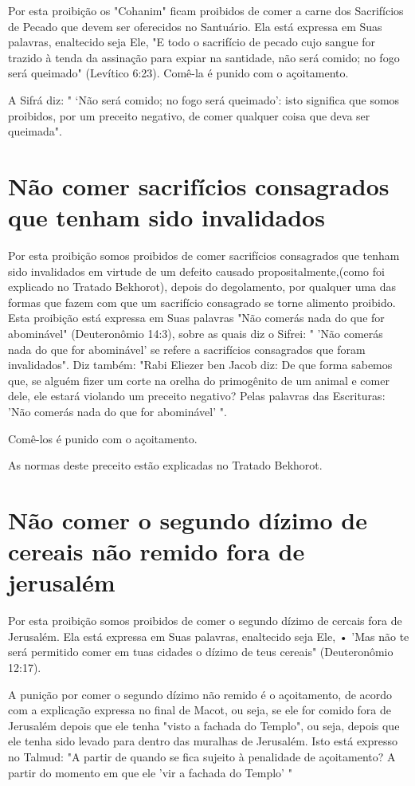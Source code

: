 \begin{itemize}
\begin{enumrate}
\begin{itemize}
\begin{itemize}
\begin{itemize}
Por esta proibição os "Cohanim" ficam proibidos de comer a carne dos
Sacrifícios de Pecado que devem ser oferecidos no Santuário. Ela está
ex­pressa em Suas palavras, enaltecido seja Ele, "E todo o sacrifício de
pecado cu­jo sangue for trazido à tenda da assinação para expiar na
santidade, não será comido; no fogo será queimado" (Levítico 6:23).
Comê-la é punido com o açoitamento.

A Sifrá diz: " `Não será comido; no fogo será queimado': isto signifi­ca
que somos proibidos, por um preceito negativo, de comer qualquer coisa
que deva ser queimada".

\section{Não comer sacrifícios consagrados que tenham sido invalidados}

Por esta proibição somos proibidos de comer sacrifícios consagra­dos que
tenham sido invalidados em virtude de um defeito causado
proposital­mente,(como foi explicado no Tratado Bekhorot), depois do
degolamento, por
qualquer uma das formas que fazem com que um sacrifício consagrado se
tor­ne alimento proibido. Esta proibição está expressa em Suas palavras
"Não co­merás nada do que for abominável" (Deuteronômio 14:3), sobre as
quais diz o Sifrei: " 'Não comerás nada do que for abominável' se refere
a sacrifícios con­sagrados que foram invalidados". Diz também: "Rabi
Eliezer ben Jacob diz: De que forma sabemos que, se alguém fizer um
corte na orelha do primogênito de um animal e comer dele, ele estará
violando um preceito negativo? Pelas palavras das Escrituras: 'Não
comerás nada do que for abominável' ".

Comê-los é punido com o açoitamento.


As normas deste preceito estão explicadas no Tratado Bekhorot.

\section{Não comer o segundo dízimo de cereais não remido fora de jerusalém}

Por esta proibição somos proibidos de comer o segundo dízimo de cercais
fora de Jerusalém. Ela está expressa em Suas palavras, enaltecido seja
Ele, • 'Mas não te será permitido comer em tuas cidades o dízimo de teus
ce­reais" (Deuteronômio 12:17).

A punição por comer o segundo dízimo não remido é o açoitamento, de
acordo com a explicação expressa no final de Macot, ou seja, se ele for
comi­do fora de Jerusalém depois que ele tenha "visto a fachada do
Templo", ou seja, depois que ele tenha sido levado para dentro das
muralhas de Jerusalém. Isto está expresso no Talmud: "A partir de quando
se fica sujeito à penalidade de açoitamento? A partir do momento em que
ele 'vir a fachada do Templo' "


\end{itemize}
\end{itemize}
\end{itemize}
\end{enumrate}
\end{itemize}
